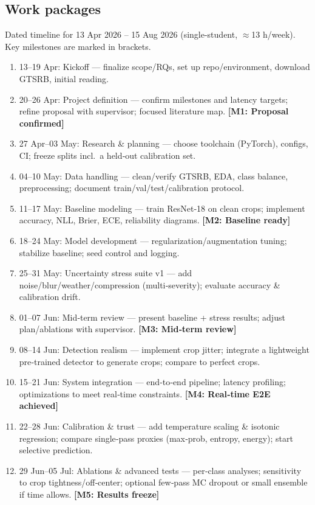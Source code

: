 \documentclass[11pt,a4paper]{article}
\begin{document}
\subsection{Work packages}

Dated timeline for 13 Apr 2026 -- 15 Aug 2026 (single-student, \(\approx\)13 h/week). Key milestones are marked in brackets.

\begin{enumerate}[label=\textbf{W\arabic*}, leftmargin=*]
  \item 13--19 Apr: Kickoff — finalize scope/RQs, set up repo/environment, download GTSRB, initial reading.
  \item 20--26 Apr: Project definition — confirm milestones and latency targets; refine proposal with supervisor; focused literature map. \textbf{[M1: Proposal confirmed]}
  \item 27 Apr--03 May: Research \& planning — choose toolchain (PyTorch), configs, CI; freeze splits incl.\ a held‑out calibration set.
  \item 04--10 May: Data handling — clean/verify GTSRB, EDA, class balance, preprocessing; document train/val/test/calibration protocol.
  \item 11--17 May: Baseline modeling — train ResNet‑18 on clean crops; implement accuracy, NLL, Brier, ECE, reliability diagrams. \textbf{[M2: Baseline ready]}
  \item 18--24 May: Model development — regularization/augmentation tuning; stabilize baseline; seed control and logging.
  \item 25--31 May: Uncertainty stress suite v1 — add noise/blur/weather/compression (multi‑severity); evaluate accuracy \& calibration drift.
  \item 01--07 Jun: Mid‑term review — present baseline + stress results; adjust plan/ablations with supervisor. \textbf{[M3: Mid‑term review]}
  \item 08--14 Jun: Detection realism — implement crop jitter; integrate a lightweight pre‑trained detector to generate crops; compare to perfect crops.
  \item 15--21 Jun: System integration — end‑to‑end pipeline; latency profiling; optimizations to meet real‑time constraints. \textbf{[M4: Real‑time E2E achieved]}
  \item 22--28 Jun: Calibration \& trust — add temperature scaling \& isotonic regression; compare single‑pass proxies (max‑prob, entropy, energy); start selective prediction.
  \item 29 Jun--05 Jul: Ablations \& advanced tests — per‑class analyses; sensitivity to crop tightness/off‑center; optional few‑pass MC dropout or small ensemble if time allows. \textbf{[M5: Results freeze]}

\end{enumerate}
\end{document}

